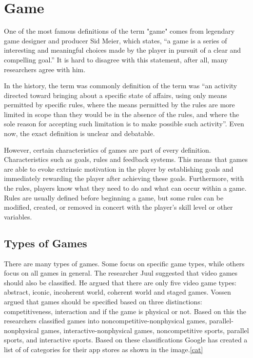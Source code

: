\documentclass[10pt,oneside,english,a4paper]{article}
\begin{document}
\section{Game} \label{game}

\par
One of the most famous definitions of the term "game" comes from legendary game designer and producer Sid Meier, which states, “a game is a series of interesting and meaningful choices made by the player in pursuit of a clear and compelling goal.” It is hard to disagree with this statement, after all, many researchers agree with him.\cite{Hu:gamification}
\par
In the history, the term was commonly definition of the term was “an activity directed toward bringing about a specific state of affairs, using only means permitted by specific rules, where the means permitted by the rules are more limited in scope than they would be in the absence of the rules, and where the sole reason for accepting such limitation is to make possible such activity”.\cite{suits:game} Even now, the exact definition is unclear and debatable. 
\par 
However, certain characteristics of games are part of every definition. Characteristics such as goals, rules and feedback systems. This means that games are able to evoke extrinsic motivation in the player by establishing goals and immediately rewarding the player after achieving these goals. Furthermore, with the rules, players know what they need to do and what can occur within a game. Rules are usually defined before beginning a game, but some rules can be modified, created, or removed in concert with the player's skill level or other variables.\cite{Hu:gamification}


\subsection{Types of Games} \label{types of games}

\par
There are many types of games. Some focus on specific game types, while others focus on all games in general. The researcher Juul suggested that video games should also be classified. He argued that there are only five video game types: abstract, iconic, incoherent world, coherent world and staged games. Vossen argued that games should be specified based on three distinctions: competitiveness, interaction and if the game is physical or not. Based on this the researchers classified games into noncompetitive-nonphysical games, parallel-nonphysical games, interactive-nonphysical games, noncompetitive sports, parallel sports, and interactive sports. Based on these classifications Google has created a list of of categories for their app stores as shown in the image.\ref{cat} \cite{Hu:gamification} 
\end{document}
